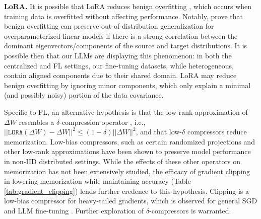 \textbf{LoRA.} It is possible that LoRA reduces benign overfitting \citep{bartlett2020benign}, which occurs when training data is overfitted without affecting performance. Notably, \citet{tang2023dpadambc} prove that benign overfitting can preserve out-of-distribution generalization for overparameterized linear models if there is a strong correlation between the dominant eigenvectors/components of the source and target distributions. It is possible then that our LLMs are displaying this phenomenon: in both the centralized and FL settings, our fine-tuning datasets, while heterogeneous, contain aligned components due to their shared domain. LoRA may reduce benign overfitting by ignoring minor components, which only explain a minimal (and possibly noisy) portion of the data covariance. 

Specific to FL, an alternative hypothesis is that the low-rank approximation of $\Delta W$ resembles a $\delta$-compression operator \citep{karimireddy2019error}, i.e., $||\texttt{LORA}(\Delta W)-\Delta W||^2 \leq (1-\delta)||\Delta W||^2$, and that low-$\delta$ compressors reduce memorization. Low-bias compressors, such as certain randomized projections \citep{dorfman2023docofl, rabbani2021comfetch, ivkin2019communication} and other low-rank approximations \citep{makkuva2023laser} have been shown to preserve model performance in non-IID distributed settings. While the effects of these other operators on memorization has not been extensively studied, the efficacy of gradient clipping in lowering memorization while maintaining accuracy (Table \ref{tab:gradient_clipping}) lends further credence to this hypothesis. Clipping is a low-bias compressor for heavy-tailed gradients, which is observed for general SGD \citep{mireshghallah2022quantifying} and LLM fine-tuning \citep{kenton2019bert}. Further exploration of $\delta$-compressors is warranted.